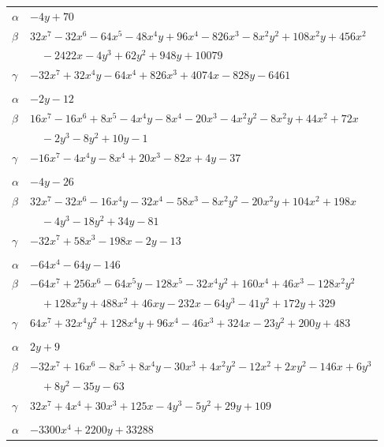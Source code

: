 \documentclass[11pt]{article}
\begin{document}
\begin{longtable}{@{}ll@{}}
$\alpha$ & $-4y+70$\\
$\beta$ & $32x^{7}-32x^{6}-64x^{5}-48x^{4}y+96x^{4}-826x^{3}-8x^{2}y^{2}+108x^{2}y+456x^{2}$\\
 & $\quad -2422x-4y^{3}+62y^{2}+948y+10079$\\
$\gamma$ & $-32x^{7}+32x^{4}y-64x^{4}+826x^{3}+4074x-828y-6461$\\
\addlinespace[3pt]
\multicolumn{2}{@{}l}{$\{i,j\}=\{41,63\}$, $k_{ij}=3^{3}$}\\
$\alpha$ & $-2y-12$\\
$\beta$ & $16x^{7}-16x^{6}+8x^{5}-4x^{4}y-8x^{4}-20x^{3}-4x^{2}y^{2}-8x^{2}y+44x^{2}+72x$\\
 & $\quad -2y^{3}-8y^{2}+10y-1$\\
$\gamma$ & $-16x^{7}-4x^{4}y-8x^{4}+20x^{3}-82x+4y-37$\\
\addlinespace[3pt]
\multicolumn{2}{@{}l}{$\{i,j\}=\{41,78\}$, $k_{ij}=2\cdot 3^{4}$}\\
$\alpha$ & $-4y-26$\\
$\beta$ & $32x^{7}-32x^{6}-16x^{4}y-32x^{4}-58x^{3}-8x^{2}y^{2}-20x^{2}y+104x^{2}+198x$\\
 & $\quad -4y^{3}-18y^{2}+34y-81$\\
$\gamma$ & $-32x^{7}+58x^{3}-198x-2y-13$\\
\addlinespace[3pt]
\multicolumn{2}{@{}l}{$\{i,j\}=\{41,80\}$, $k_{ij}=2\cdot 3^{4}$}\\
$\alpha$ & $-64x^{4}-64y-146$\\
$\beta$ & $-64x^{7}+256x^{6}-64x^{5}y-128x^{5}-32x^{4}y^{2}+160x^{4}+46x^{3}-128x^{2}y^{2}$\\
 & $\quad +128x^{2}y+488x^{2}+46xy-232x-64y^{3}-41y^{2}+172y+329$\\
$\gamma$ & $64x^{7}+32x^{4}y^{2}+128x^{4}y+96x^{4}-46x^{3}+324x-23y^{2}+200y+483$\\
\addlinespace[3pt]
\multicolumn{2}{@{}l}{$\{i,j\}=\{42,43\}$, $k_{ij}=2^{3}\cdot 3^{2}$}\\
$\alpha$ & $2y+9$\\
$\beta$ & $-32x^{7}+16x^{6}-8x^{5}+8x^{4}y-30x^{3}+4x^{2}y^{2}-12x^{2}+2xy^{2}-146x+6y^{3}$\\
 & $\quad +8y^{2}-35y-63$\\
$\gamma$ & $32x^{7}+4x^{4}+30x^{3}+125x-4y^{3}-5y^{2}+29y+109$\\
\addlinespace[3pt]
\multicolumn{2}{@{}l}{$\{i,j\}=\{42,47\}$, $k_{ij}=2^{5}\cdot 3^{2}\cdot 7^{2}\cdot 17$}\\
$\alpha$ & $-3300x^{4}+2200y+33288$\\

\end{longtable}
\end{document}
